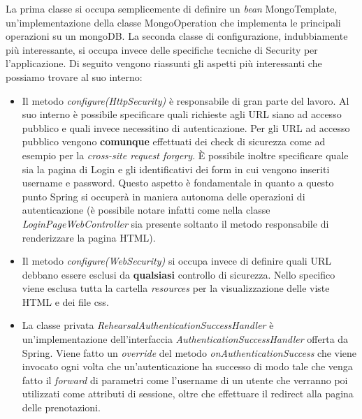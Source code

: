 La prima classe si occupa semplicemente di definire un \textsl{bean} MongoTemplate, un'implementazione della classe MongoOperation che implementa le principali operazioni su un mongoDB.\newline
La seconda classe di configurazione, indubbiamente più interessante, si occupa invece delle specifiche tecniche di Security per l'applicazione. Di seguito vengono riassunti gli aspetti più interessanti che possiamo trovare al suo interno:
\begin{itemize}
	\item Il metodo \textsl{configure(HttpSecurity)} è responsabile di gran parte del lavoro. Al suo interno è possibile specificare quali richieste agli URL siano ad accesso pubblico e quali invece necessitino di autenticazione. Per gli URL ad accesso pubblico vengono \textbf{comunque} effettuati dei check di sicurezza come ad esempio per la \textsl{cross-site request forgery}. È possibile inoltre specificare quale sia la pagina di Login e gli identificativi dei form in cui vengono inseriti username e password. Questo aspetto è fondamentale in quanto a questo punto Spring si occuperà in maniera autonoma delle operazioni di autenticazione (è possibile notare infatti come nella classe \textsl{LoginPageWebController} sia presente soltanto il metodo responsabile di renderizzare la pagina HTML).
	\item Il metodo \textsl{configure(WebSecurity)} si occupa invece di definire quali URL debbano essere esclusi da \textbf{qualsiasi} controllo di sicurezza. Nello specifico viene esclusa tutta la cartella \textsl{resources} per la visualizzazione delle viste HTML e dei file css.
	\item La classe privata \textsl{RehearsalAuthenticationSuccessHandler} è un'implementazione dell'interfaccia \textsl{AuthenticationSuccessHandler} offerta da Spring. Viene fatto un \textsl{override} del metodo \textsl{onAuthenticationSuccess} che viene invocato ogni volta che un'autenticazione ha successo di modo tale che venga fatto il \textsl{forward} di parametri come l'username di un utente che verranno poi utilizzati come attributi di sessione, oltre che effettuare il redirect alla pagina delle prenotazioni.
\end{itemize}

